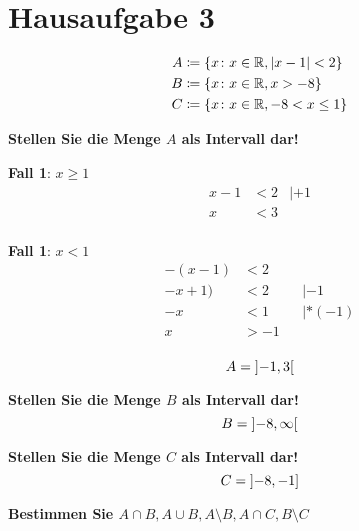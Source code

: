 \documentclass{article}
\begin{document}
\section*{Hausaufgabe 3}

\begin{align*}
  A &\coloneqq \{ x \colon x \in \mathbb{R}, \abs{x - 1} < 2 \} \\
  B &\coloneqq \{ x \colon x \in \mathbb{R}, x > -8 \} \\
  C &\coloneqq \{ x \colon x \in \mathbb{R}, -8 <x \leq 1 \} \\
\end{align*}

\textbf{Stellen Sie die Menge $A$ als Intervall dar!} \\

\begin{minipage}[t]{.45\textwidth}
  \textbf{Fall 1}: $x \geq 1$ \\
  \begin{align*}
    x - 1 &< 2 & | +1\\
    x &< 3 \\
  \end{align*}
\end{minipage}
\hfill
\vrule
\hfill
\begin{minipage}[t]{.45\textwidth}
  \textbf{Fall 1}: $x < 1$ \\
  \begin{align*}
    -(x - 1) &< 2 \\
    -x + 1) &< 2 &&| -1 \\
    -x &< 1 &&| * (-1) \\
    x &> -1 \\
  \end{align*}
\end{minipage}

\[
  A = \interval[open]{-1}{3}
\]

\textbf{Stellen Sie die Menge $B$ als Intervall dar!} \\

\[
  B = \interval[open]{-8}{\infty}
\]

\textbf{Stellen Sie die Menge $C$ als Intervall dar!} \\

\[
  C = \interval[open left]{-8}{-1}
\]

\textbf{Bestimmen Sie $A \cap B, A \cup B, A \setminus B, A \cap C, B \setminus C$}
\end{document}
